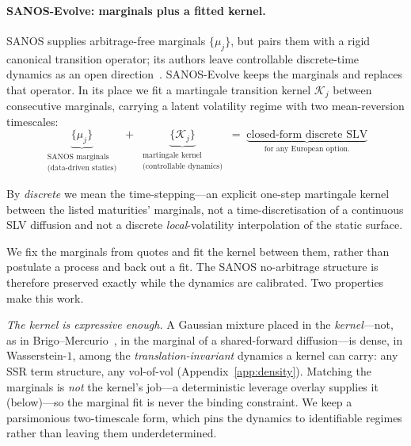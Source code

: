 \documentclass[11pt]{article}
\newcommand{\cK}{\mathcal{K}}
\begin{document}
\paragraph{SANOS-Evolve: marginals plus a fitted kernel.}
SANOS supplies arbitrage-free marginals $\{\mu_j\}$, but pairs them with a rigid canonical transition
operator; its authors leave controllable discrete-time dynamics as an open
direction~\cite{buehler2026sanos}. SANOS-Evolve keeps the marginals and replaces that operator. In its
place we fit a martingale transition kernel $\cK_j$ between consecutive marginals, carrying a latent
volatility regime with two mean-reversion timescales:
\[
\underbrace{\{\mu_j\}}_{\substack{\text{SANOS marginals}\\\text{(data-driven statics)}}}
\;+\;
\underbrace{\{\cK_j\}}_{\substack{\text{martingale kernel}\\\text{(controllable dynamics)}}}
\;=\;
\underbrace{\text{closed-form discrete SLV}}_{\text{for any European option.}}
\]

By \emph{discrete} we mean the time-stepping---an explicit one-step martingale kernel between the
listed maturities' marginals, not a time-discretisation of a continuous SLV diffusion and not a
discrete \emph{local}-volatility interpolation of the static surface.

We fix the marginals from quotes and fit the kernel between them, rather than postulate a process and
back out a fit. The SANOS no-arbitrage structure is therefore preserved exactly while the dynamics are
calibrated. Two properties make this work.

\emph{The kernel is expressive enough.} A Gaussian mixture placed in the \emph{kernel}---not, as in
Brigo--Mercurio~\cite{brigo2002}, in the marginal of a shared-forward diffusion---is dense, in
Wasserstein-$1$, among the \emph{translation-invariant} dynamics a kernel can carry: any SSR term
structure, any vol-of-vol (Appendix~\ref{app:density}). Matching the marginals is \emph{not} the
kernel's job---a deterministic leverage overlay supplies it (below)---so the marginal fit is never the
binding constraint. We keep a parsimonious two-timescale form, which pins the dynamics to
identifiable regimes rather than leaving them underdetermined.
\end{document}
